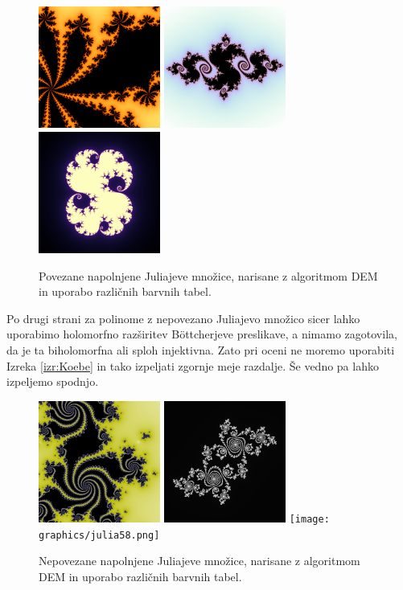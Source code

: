 \documentclass[12pt,a4paper]{amsart}
\theoremstyle{definition} %
\theoremstyle{plain} %
\begin{document}
\begin{figure}[h]
\includegraphics[height=4cm]{graphics/julia38.png}
\includegraphics[height=4cm]{graphics/julia64.png}
\includegraphics[height=4cm]{graphics/julia70.png}

\caption{
Povezane napolnjene Juliajeve množice, 
narisane z algoritmom DEM in uporabo različnih barvnih tabel.
}
\end{figure}

Po drugi strani za polinome z nepovezano Juliajevo množico sicer lahko uporabimo holomorfno razširitev B{\"o}ttcherjeve preslikave, 
a nimamo zagotovila, da je ta biholomorfna ali sploh injektivna.
Zato pri oceni ne moremo uporabiti Izreka \ref{izr:Koebe} in tako izpeljati zgornje meje razdalje.
Še vedno pa lahko izpeljemo spodnjo.

\begin{figure}[h]
\includegraphics[height=4cm]{graphics/julia30.png}
\includegraphics[height=4cm]{graphics/julia77.png}
\texttt{[image: graphics/julia58.png]}

\caption{
Nepovezane napolnjene Juliajeve množice, 
narisane z algoritmom DEM in uporabo različnih barvnih tabel.
}
\end{figure}
\end{document}
